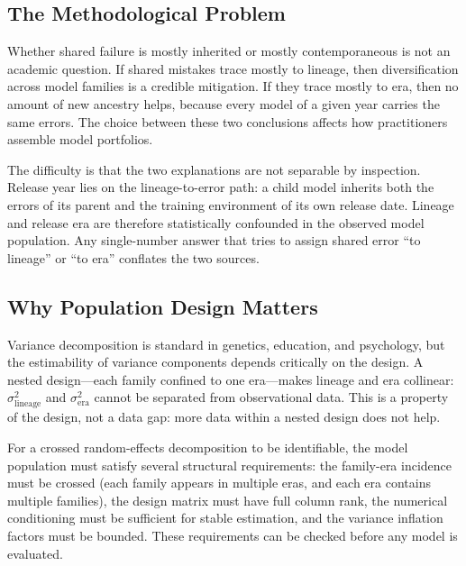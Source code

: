 \documentclass{ieeeaccess}
\theoremstyle{definition}
\theoremstyle{plain}
\begin{document}
\subsection{The Methodological Problem}
Whether shared failure is mostly inherited or mostly contemporaneous is not an academic question. If shared mistakes trace mostly to lineage, then diversification across model families is a credible mitigation. If they trace mostly to era, then no amount of new ancestry helps, because every model of a given year carries the same errors. The choice between these two conclusions affects how practitioners assemble model portfolios.

The difficulty is that the two explanations are not separable by inspection. Release year lies on the lineage-to-error path: a child model inherits both the errors of its parent and the training environment of its own release date. Lineage and release era are therefore statistically confounded in the observed model population. Any single-number answer that tries to assign shared error ``to lineage'' or ``to era'' conflates the two sources.

\subsection{Why Population Design Matters}
Variance decomposition is standard in genetics, education, and psychology, but the estimability of variance components depends critically on the design. A nested design---each family confined to one era---makes lineage and era collinear: $\sigma^2_{\text{lineage}}$ and $\sigma^2_{\text{era}}$ cannot be separated from observational data. This is a property of the design, not a data gap: more data within a nested design does not help.

For a crossed random-effects decomposition to be identifiable, the model population must satisfy several structural requirements: the family-era incidence must be crossed (each family appears in multiple eras, and each era contains multiple families), the design matrix must have full column rank, the numerical conditioning must be sufficient for stable estimation, and the variance inflation factors must be bounded. These requirements can be checked before any model is evaluated.
\end{document}
